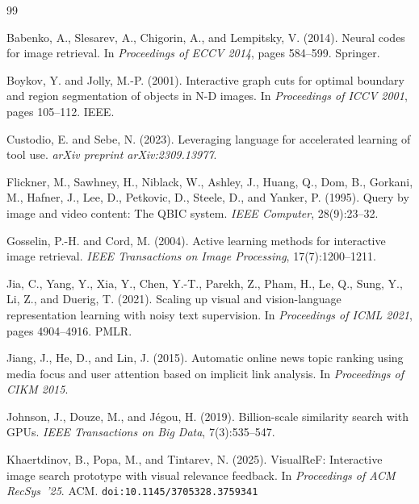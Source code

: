 \documentclass[12pt,a4paper]{article}
\begin{document}

\begin{thebibliography}{99}

Babenko, A., Slesarev, A., Chigorin, A., and Lempitsky, V. (2014).
Neural codes for image retrieval.
In \emph{Proceedings of ECCV 2014}, pages 584--599. Springer.

Boykov, Y. and Jolly, M.-P. (2001).
Interactive graph cuts for optimal boundary and region segmentation of objects in N-D images.
In \emph{Proceedings of ICCV 2001}, pages 105--112. IEEE.

Custodio, E. and Sebe, N. (2023).
Leveraging language for accelerated learning of tool use.
\emph{arXiv preprint arXiv:2309.13977}.

Flickner, M., Sawhney, H., Niblack, W., Ashley, J., Huang, Q., Dom, B., Gorkani, M.,
Hafner, J., Lee, D., Petkovic, D., Steele, D., and Yanker, P. (1995).
Query by image and video content: The QBIC system.
\emph{IEEE Computer}, 28(9):23--32.

Gosselin, P.-H. and Cord, M. (2004).
Active learning methods for interactive image retrieval.
\emph{IEEE Transactions on Image Processing}, 17(7):1200--1211.

Jia, C., Yang, Y., Xia, Y., Chen, Y.-T., Parekh, Z., Pham, H., Le, Q., Sung, Y.,
Li, Z., and Duerig, T. (2021).
Scaling up visual and vision-language representation learning with noisy text supervision.
In \emph{Proceedings of ICML 2021}, pages 4904--4916. PMLR.

Jiang, J., He, D., and Lin, J. (2015).
Automatic online news topic ranking using media focus and user attention based on
implicit link analysis.
In \emph{Proceedings of CIKM 2015}.

Johnson, J., Douze, M., and Jégou, H. (2019).
Billion-scale similarity search with GPUs.
\emph{IEEE Transactions on Big Data}, 7(3):535--547.

Khaertdinov, B., Popa, M., and Tintarev, N. (2025).
{VisualReF}: Interactive image search prototype with visual relevance feedback.
In \emph{Proceedings of ACM RecSys~'25}. ACM.
\texttt{doi:10.1145/3705328.3759341}


\end{thebibliography}
\end{document}
